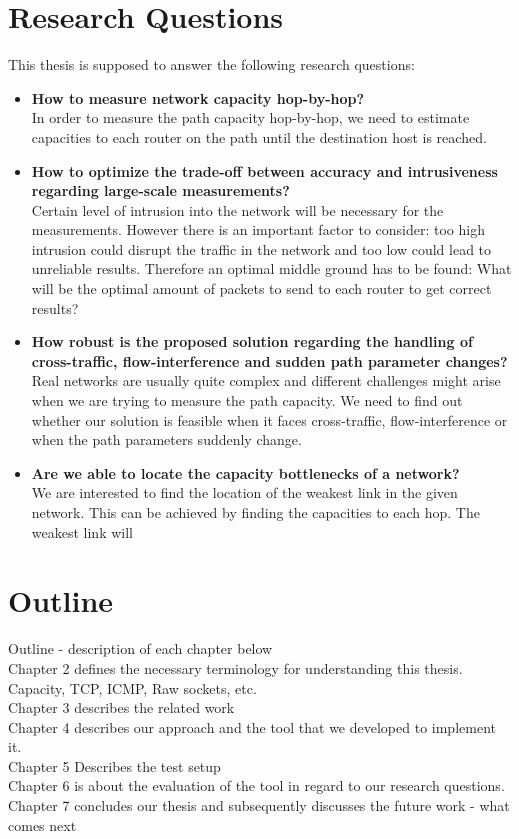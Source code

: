 \section{Research Questions}
This thesis is supposed to answer the following research questions:

\begin{itemize}
  \item \textbf{How to measure network capacity hop-by-hop?}
  \\In order to measure the path capacity hop-by-hop, we need to estimate capacities to each router on the path until the destination host is reached. 
  \item \textbf{How to optimize the trade-off between accuracy and intrusiveness regarding large-scale measurements?}
  \\Certain level of intrusion into the network will be necessary for the measurements. However there is an important factor to consider: too high intrusion could disrupt the traffic in the network and too low could lead to unreliable results. Therefore an optimal middle ground has to be found: What will be the optimal amount of packets to send to each router to get correct results?
  \item \textbf{How robust is the proposed solution regarding the handling of cross-traffic, flow-interference and sudden path parameter changes?}
  \\Real networks are usually quite complex and different challenges might arise when we are trying to measure the path capacity. We need to find out whether our solution is feasible when it faces cross-traffic, flow-interference or when the path parameters suddenly change.
  \item \textbf{Are we able to locate the capacity bottlenecks of a network?}
  \\ We are interested to find the location of the weakest link in the given network. This can be achieved by finding the capacities to each hop. The weakest link will 
\end{itemize}

\section{Outline}
Outline - description of each chapter below
\\Chapter 2 defines the necessary terminology for understanding this thesis. Capacity, TCP, ICMP, Raw sockets, etc. 
\\Chapter 3 describes the related work 
\\Chapter 4 describes our approach and the tool that we developed to implement it.
\\Chapter 5 Describes the test setup
\\Chapter 6 is about the evaluation of the tool in regard to our research questions. 
\\Chapter 7 concludes our thesis and subsequently discusses the future work - what comes next
